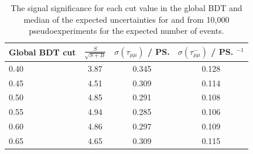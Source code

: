 {\begin{table}[htbp]
\begin{center}
\begin{tabular}{lccc}
\hline
Global BDT cut & $\frac{S}{\sqrt{S+B}}$&  $\sigma \left(\tau_{\mu\mu} \right)$   / \ps & $\sigma \left(\tau^{-}_{\mu\mu} \right)$ / \ps$^{-1}$ \\   
\hline
0.40           & 3.87 & 0.345 & 0.128 \\ %
0.45        & 4.51 & 0.309 & 0.114 \\ %
0.50        & 4.85 & 0.291 & 0.108 \\ %
0.55       & 4.94 & 0.285 & 0.106 \\ %
0.60           & 4.86 & 0.297 & 0.109 \\ %
0.65            & 4.65 & 0.309 & 0.115 \\  \hline%
\end{tabular} 
\vspace{0.7cm}
\caption{ The signal significance for each cut value in the global BDT and median of the expected uncertainties for \tmumu and \invtmumu from 10,000 pseudoexperiments for the expected number of events. }
\label{tab:selOptimisation}
\end{center}
\vspace{-1.0cm}
\end{table}

}
